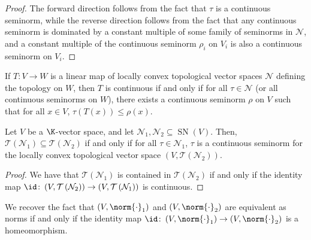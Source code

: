 \documentclass[10pt]{mypackage}
\begin{document}
\begin{proof}
  The forward direction follows from the fact that $\tau$ is a continuous seminorm, while the reverse direction follows from the fact that any continuous seminorm is dominated by a constant multiple of some family of seminorms in $ \mathcal{N} $, and a constant multiple of the continuous seminorm $\rho_i$ on $V_i$ is also a continuous seminorm on $V_i$.
\end{proof}
\begin{corollary}
  If $T\colon V\rightarrow W$ is a linear map of locally convex topological vector spaces $ \mathcal{N} $ defining the topology on $W$, then $T$ is continuous if and only if for all $\tau\in \mathcal{N}$ (or all continuous seminorms on $W$), there exists a continuous seminorm $\rho$ on $V$ such that for all $x\in V$, $\tau\left( T(x) \right)\leq \rho(x)$.
\end{corollary}
\begin{proposition}
  Let $V$ be a $\K$-vector space, and let $ \mathcal{N}_1,\mathcal{N}_2\subseteq \operatorname{SN}(V) $. Then, $ \mathcal{T}\left( \mathcal{N}_1 \right)\subseteq \mathcal{T}\left( \mathcal{N}_2 \right) $ if and only if for all $ \tau\in \mathcal{N}_1 $, $\tau$ is a continuous seminorm for the locally convex topological vector space $\left( V, \mathcal{T}\left( \mathcal{N}_2 \right) \right)$.
\end{proposition}
\begin{proof}
  We have that $ \mathcal{T}\left( \mathcal{N}_1 \right) $ is contained in $ \mathcal{T}\left( \mathcal{N}_2 \right) $ if and only if the identity map $\id\colon \left( V,\mathcal{T}\left( \mathcal{N}_2 \right) \right)\rightarrow \left( V,\mathcal{T}\left( \mathcal{N}_1 \right) \right)$ is continuous.
\end{proof}
\begin{remark}
  We recover the fact that $\left( V,\norm{\cdot}_1 \right)$ and $\left( V,\norm{\cdot}_2 \right)$ are equivalent as norms if and only if the identity map $ \id\colon \left( V,\norm{\cdot}_1 \right) \rightarrow \left( V,\norm{\cdot}_2 \right)$ is a homeomorphism.
\end{remark}
\end{document}
